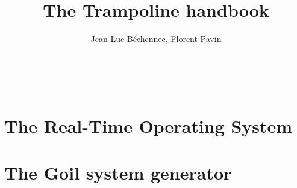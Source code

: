 \documentclass[11pt]{manual}
\title{The Trampoline handbook}
\author{Jean-Luc B\'echennec, Florent Pavin}
\begin{document}
\maketitle
~\newpage
\setcounter{tocdepth}{2}
\tableofcontents

\part{The Real-Time Operating System}








\part{The Goil system generator}


\printindex



 
\end{document}
